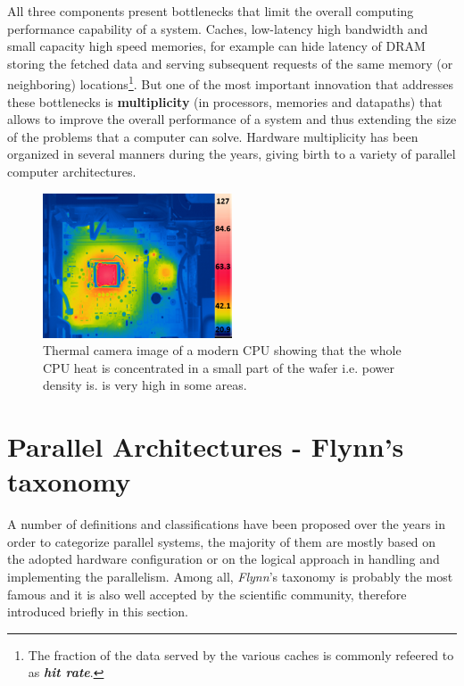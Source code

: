 All three components present bottlenecks that limit the overall computing performance capability of a system.
Caches, low-latency high bandwidth and small capacity high speed memories, for example can hide latency of DRAM storing the fetched data and serving subsequent requests of the same memory (or neighboring) locations\footnote{The fraction of the data served by the various caches is commonly refeered to as \textit{\textbf{hit rate}}.}.
But one of the most important innovation that addresses these bottlenecks is \textbf{multiplicity} (in processors, memories and datapaths) that allows to improve the overall performance of a system and thus extending the size of the problems that a computer can solve.
Hardware multiplicity has been organized in several manners during the years, giving birth to a variety of parallel computer architectures.
\begin{figure}[!htbp]
	\centering
	\includegraphics[width=0.5\textwidth]{./images/parallel_programming/heat_cpu}
	\caption[CPU and Motherboard Temperature.]{Thermal camera image of a modern CPU showing that the whole CPU heat is concentrated in a small part of the wafer i.e. power density is. is very high in some areas.}\label{fig:tempCPU_thermal}
\end{figure}

\section{Parallel Architectures - Flynn's taxonomy}
\label{sec:flynn_tax}
A number of definitions and classifications have been proposed  over the years in order to categorize parallel systems, the majority of them are mostly based on the adopted hardware configuration or on the logical approach in handling and implementing the parallelism.
Among all, \textit{Flynn}'s  taxonomy \cite{flynn:1972,duncan:1990} is probably the most famous and it is also well accepted by the scientific community, therefore introduced briefly in this section.

